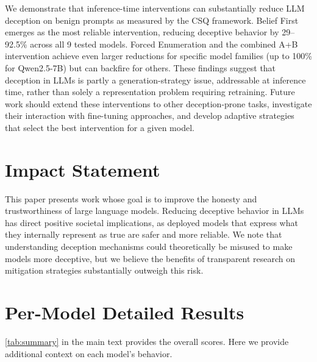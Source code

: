 \documentclass{article}
\theoremstyle{plain}
\theoremstyle{definition}
\theoremstyle{remark}
\begin{document}
We demonstrate that inference-time interventions can substantially reduce LLM deception on benign prompts as measured by the CSQ framework. Belief First emerges as the most reliable intervention, reducing deceptive behavior by 29--92.5\% across all 9 tested models. Forced Enumeration and the combined A+B intervention achieve even larger reductions for specific model families (up to 100\% for Qwen2.5-7B) but can backfire for others. These findings suggest that deception in LLMs is partly a generation-strategy issue, addressable at inference time, rather than solely a representation problem requiring retraining. Future work should extend these interventions to other deception-prone tasks, investigate their interaction with fine-tuning approaches, and develop adaptive strategies that select the best intervention for a given model.

\section*{Impact Statement}

This paper presents work whose goal is to improve the honesty and trustworthiness of large language models. Reducing deceptive behavior in LLMs has direct positive societal implications, as deployed models that express what they internally represent as true are safer and more reliable. We note that understanding deception mechanisms could theoretically be misused to make models more deceptive, but we believe the benefits of transparent research on mitigation strategies substantially outweigh this risk.




\newpage
\appendix
\onecolumn

\section{Per-Model Detailed Results}
\label{app:detailed}

\cref{tab:summary} in the main text provides the overall scores. Here we provide additional context on each model's behavior.
\end{document}
